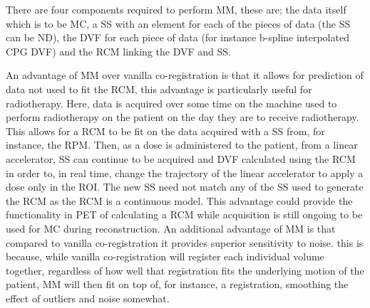             There are four components required to perform \gls{MM}, these are; the data itself which is to be \gls{MC}, a \gls{SS} with an element for each of the pieces of data (the \gls{SS} can be \gls{ND}), the \gls{DVF} for each piece of data (for instance b-spline interpolated \gls{CPG} \gls{DVF}) and the \gls{RCM} linking the \gls{DVF} and \gls{SS}.
            
            An advantage of \gls{MM} over vanilla co-registration is that it allows for prediction of data not used to fit the \gls{RCM}, this advantage is particularly useful for radiotherapy. Here, data is acquired over some time on the machine used to perform radiotherapy on the patient on the day they are to receive radiotherapy. This allows for a \gls{RCM} to be fit on the data acquired with a \gls{SS} from, for instance, the \gls{RPM}. Then, as a dose is administered to the patient, from a linear accelerator, \gls{SS} can continue to be acquired and \gls{DVF} calculated using the \gls{RCM} in order to, in real time, change the trajectory of the linear accelerator to apply a dose only in the \gls{ROI}. The new \gls{SS} need not match any of the \gls{SS} used to generate the \gls{RCM} as the \gls{RCM} is a continuous model. This advantage could provide the functionality in \gls{PET} of calculating a \gls{RCM} while acquisition is still ongoing to be used for \gls{MC} during reconstruction. An additional advantage of \gls{MM} is that compared to vanilla co-registration it provides superior sensitivity to noise. this is because, while vanilla co-registration will register each individual volume together, regardless of how well that registration fits the underlying motion of the patient, \gls{MM} will then fit on top of, for instance, a registration, smoothing the effect of outliers and noise somewhat.
            
